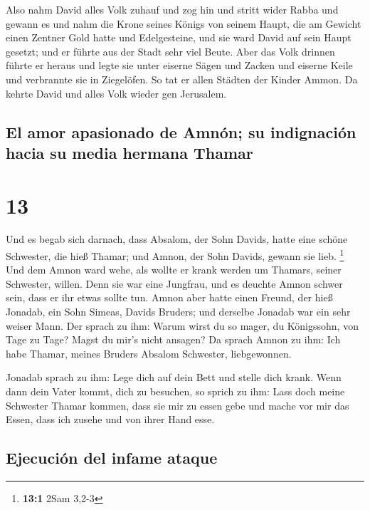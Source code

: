  Also nahm David alles Volk zuhauf und zog hin und stritt
wider Rabba und gewann es  und nahm die Krone seines
Königs von seinem Haupt, die am Gewicht einen Zentner Gold hatte und
Edelgesteine, und sie ward David auf sein Haupt gesetzt; und er führte
aus der Stadt sehr viel Beute.  Aber das Volk drinnen
führte er heraus und legte sie unter eiserne Sägen und Zacken und
eiserne Keile und verbrannte sie in Ziegelöfen. So tat er allen Städten
der Kinder Ammon. Da kehrte David und alles Volk wieder gen Jerusalem.

\hypertarget{el-amor-apasionado-de-amnuxf3n-su-indignaciuxf3n-hacia-su-media-hermana-thamar}{%
\subsection{El amor apasionado de Amnón; su indignación hacia su media
hermana
Thamar}\label{el-amor-apasionado-de-amnuxf3n-su-indignaciuxf3n-hacia-su-media-hermana-thamar}}

\hypertarget{section-12}{%
\section{13}\label{section-12}}

 Und es begab sich darnach, dass Absalom, der Sohn Davids,
hatte eine schöne Schwester, die hieß Thamar; und Amnon, der Sohn
Davids, gewann sie lieb. \footnote{\textbf{13:1} 2Sam 3,2-3}
 Und dem Amnon ward wehe, als wollte er krank werden um
Thamars, seiner Schwester, willen. Denn sie war eine Jungfrau, und es
deuchte Amnon schwer sein, dass er ihr etwas sollte tun. 
Amnon aber hatte einen Freund, der hieß Jonadab, ein Sohn Simeas, Davids
Bruders; und derselbe Jonadab war ein sehr weiser Mann. 
Der sprach zu ihm: Warum wirst du so mager, du Königssohn, von Tage zu
Tage? Magst du mir's nicht ansagen? Da sprach Amnon zu ihm: Ich habe
Thamar, meines Bruders Absalom Schwester, liebgewonnen.

 Jonadab sprach zu ihm: Lege dich auf dein Bett und stelle
dich krank. Wenn dann dein Vater kommt, dich zu besuchen, so sprich zu
ihm: Lass doch meine Schwester Thamar kommen, dass sie mir zu essen gebe
und mache vor mir das Essen, dass ich zusehe und von ihrer Hand esse.

\hypertarget{ejecuciuxf3n-del-infame-ataque}{%
\subsection{Ejecución del infame
ataque}\label{ejecuciuxf3n-del-infame-ataque}}

